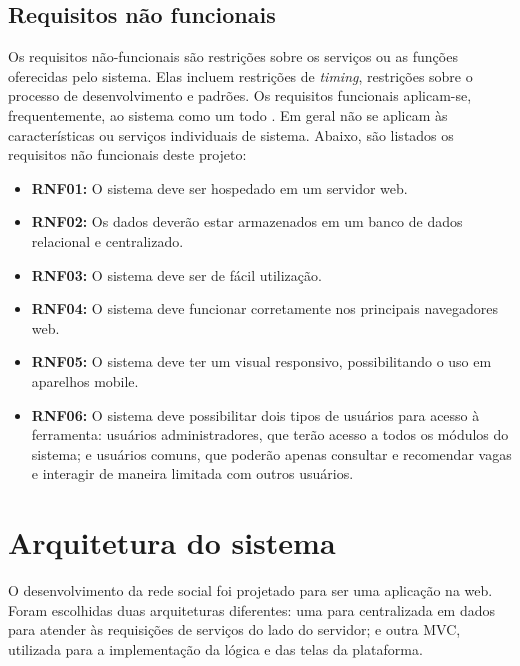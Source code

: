 \documentclass[cic,tc]{iiufrgs}
\begin{document}
\subsection{Requisitos não funcionais}
\label{requisitosRNF}
Os requisitos não-funcionais são restrições sobre os serviços ou as funções oferecidas pelo sistema. Elas incluem restrições de \textit{timing}, restrições sobre o processo de desenvolvimento e padrões. Os requisitos funcionais aplicam-se, frequentemente, ao sistema como um todo \cite{sommerville}. Em geral não se aplicam às características ou serviços individuais de sistema. Abaixo, são listados os requisitos não funcionais deste projeto:  

\begin{itemize}
    \item \textbf{RNF01:} O sistema deve ser hospedado em um servidor web.

    \item \textbf{RNF02:} Os dados deverão estar armazenados em um banco de dados relacional e centralizado.  

    \item \textbf{RNF03:} O sistema deve ser de fácil utilização.  

    \item \textbf{RNF04:} O sistema deve funcionar corretamente nos principais navegadores web.

    \item \textbf{RNF05:} O sistema deve ter um visual responsivo, possibilitando o uso em aparelhos mobile.

    \item \textbf{RNF06:} O sistema deve possibilitar dois tipos de usuários para acesso à ferramenta: usuários administradores, que terão acesso a todos os módulos do sistema; e usuários comuns, que poderão apenas consultar e recomendar vagas e interagir de maneira limitada com outros usuários.
\end{itemize}

\section{Arquitetura do sistema}
\label{arquiteturaSistema}
O desenvolvimento da rede social foi projetado para ser uma aplicação na web. Foram escolhidas duas arquiteturas diferentes: uma para centralizada em dados para atender às requisições de serviços do lado do servidor; e outra MVC, utilizada para a implementação da lógica e das telas da plataforma.
\end{document}
